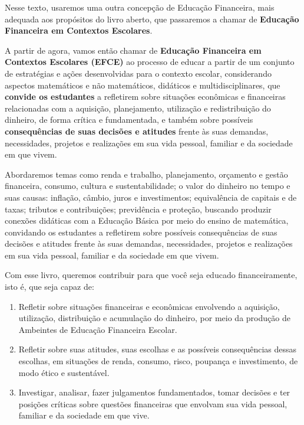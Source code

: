 Nesse texto, usaremos uma outra concepção de Educação Financeira, mais adequada aos propósitos do livro aberto, que passaremos a chamar de \textbf{Educação Financeira em Contextos Escolares}.

A partir de agora, vamos então chamar de \textbf{Educação Financeira em Contextos Escolares (EFCE)} ao processo de educar a partir de um conjunto de estratégias e ações desenvolvidas para o contexto escolar, considerando aspectos matemáticos e não matemáticos, didáticos e multidisciplinares, que \textbf{convide os estudantes} a refletirem sobre situações econômicas e financeiras relacionadas com a aquisição, planejamento, utilização e redistribuição do dinheiro, de forma crítica e fundamentada, e também sobre possíveis \textbf{consequências de suas decisões e atitudes} frente às suas demandas, necessidades, projetos e realizações em sua vida pessoal, familiar e da sociedade em que vivem.

Abordaremos temas como renda e trabalho, planejamento, orçamento e gestão financeira, consumo, cultura e sustentabilidade; o valor do dinheiro no tempo e suas causas: inflação, câmbio, juros e investimentos; equivalência de capitais e de taxas; tributos e contribuições; previdência e proteção, buscando produzir conexões didáticas com a Educação Básica por meio do ensino de matemática, convidando os estudantes a refletirem sobre possíveis consequências de suas decisões e atitudes frente às suas demandas, necessidades, projetos e realizações em sua vida pessoal, familiar e da sociedade em que vivem.

Com esse livro, queremos contribuir para que você seja educado financeiramente, isto é, que seja capaz de:

\begin{enumerate}[label=\arabic*.]

\item Refletir sobre situações financeiras e econômicas envolvendo a aquisição, utilização, distribuição e acumulação do dinheiro, por meio da produção de Ambeintes de Educação Financeira Escolar.

\item Refletir sobre suas atitudes, suas escolhas e as possíveis consequências dessas escolhas, em situações de renda, consumo, risco, poupança e investimento, de modo ético e sustentável. 

\item Investigar, analisar, fazer julgamentos fundamentados, tomar decisões e ter posições críticas sobre questões financeiras que envolvam sua vida pessoal, familiar e da sociedade em que vive.

\end{enumerate}

